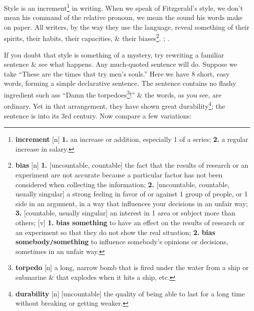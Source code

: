 \documentclass[oneside]{book}
\numberwithin{equation}{section}
\begin{document}
Style is an increment\footnote{\textbf{increment} [n] \textbf{1.} an increase or addition, especially 1 of a series; \textbf{2.} a regular increase in salary.} in writing. When we speak of Fitzgerald's style, we don't mean his command of the relative pronoun, we mean the sound his words make on paper. All writers, by the way they use the language, reveal something of their spirits, their habits, their capacities, \& their biases\footnote{\textbf{bias} [n] \textbf{1.} [uncountable, countable] the fact that the results of research or an experiment are not accurate because a particular factor has not been considered when collecting the information; \textbf{2.} [uncountable, countable, usually singular] a strong feeling in favor of or against 1 group of people, or 1 side in an argument, in a way that influences your decisions in an unfair way; \textbf{3.} [countable, usually singular] an interest in 1 area or subject more than others; [v] \textbf{1.} \textbf{bias something} to have an effect on the results of research or an experiment so that they do not show the real situation; \textbf{2.} \textbf{bias somebody\texttt{/}something} to influence somebody's opinions or decisions, sometimes in an unfair way.}.  ; . 

If you doubt that style is something of a mystery, try rewriting a familiar sentence \& see what happens. Any much-quoted sentence will do. Suppose we take ``These are the times that try men's souls.'' Here we have 8 short, easy words, forming a simple declarative sentence. The sentence contains no flashy ingredient such ass ``Damn the torpedoes\footnote{\textbf{torpedo} [n] a long, narrow bomb that is fired under the water from a ship or submarine \& that explodes when it hits a ship, etc.}!'' \& the words, as you see, are ordinary. Yet in that arrangement, they have shown great durability\footnote{\textbf{durability} [n] [uncountable] the quality of being able to last for a long time without breaking or getting weaker.}; the sentence is into its 3rd century. Now compare a few variations:
\end{document}
